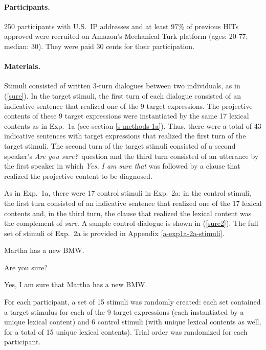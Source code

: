 \documentclass[11pt,fleqn]{article}
\newcommand{\6}{\mbox{$[\hspace*{-.6mm}[$}}
\newcommand{\9}{\mbox{$]\hspace*{-.6mm}]$}}
\begin{document}
\paragraph{Participants.} 250 participants with U.S.\ IP addresses and at least 97\% of previous HITs approved were recruited on Amazon's Mechanical Turk platform (ages: 20-77; median: 30). They were paid 30 cents for their participation.


\paragraph{Materials.} Stimuli consisted of written 3-turn dialogues between two individuals, as in (\ref{sure}). In the target stimuli, the first turn of each dialogue consisted of an indicative sentence that realized one of the 9 target expressions. The projective contents of these 9 target expressions were instantiated by the same 17 lexical contents as in Exp.~1a (see section \ref{s-methods-1a}). Thus, there were a total of 43 indicative sentences with target expressions that realized the first turn of the target stimuli. The second turn of the target stimuli consisted of a second speaker's {\em Are you sure?}~question and the third turn consisted of an utterance by the first speaker in which {\em Yes, I am sure that} was followed by a clause that realized the projective content to be diagnosed.

As in Exp.~1a, there were 17 control stimuli in Exp.~2a: in the control stimuli, the first turn consisted of an indicative sentence that realized one of the 17 lexical contents and, in the third turn, the clause that realized the lexical content was the complement of {\em sure}. A sample control dialogue is shown in (\ref{sure2}). The full set of stimuli of Exp.~2a is provided in Appendix \ref{a-exp1a-2a-stimuli}.


\begin{exe}
\ex\label{sure2}
\begin{xlist}
 Martha has a new BMW.

 Are you sure?

 Yes, I am sure that Martha has a new BMW.
\end{xlist}
\end{exe}

For each participant, a set of 15 stimuli was randomly created: each set contained a target stimulus for each of the 9 target expressions (each instantiated by a unique lexical content) and 6 control stimuli (with unique lexical contents as well, for a total of 15 unique lexical contents). Trial order was randomized for each participant.
\end{document}
